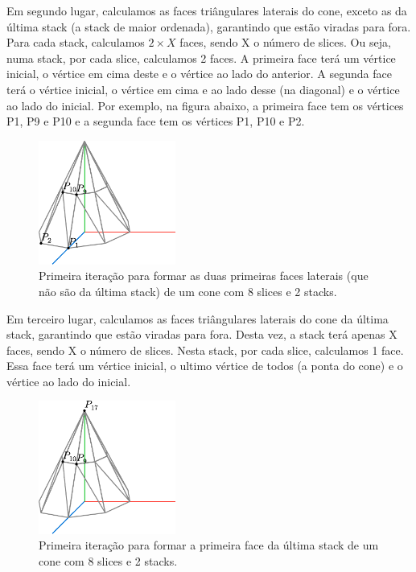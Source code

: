 \documentclass[12pt, a4paper]{article}
\begin{document}
Em segundo lugar, calculamos as faces triângulares laterais do cone, exceto as da última stack
(a stack de maior ordenada), garantindo que estão viradas para fora. Para cada stack, calculamos
$2 \times X$ faces, sendo X o número de slices. Ou seja, numa stack, por cada slice, calculamos
2 faces. A primeira face terá um vértice inicial, o vértice em cima deste e o vértice ao lado do
anterior. A segunda face terá o vértice inicial, o vértice em cima e ao lado desse (na diagonal) e o
vértice ao lado do inicial. Por exemplo, na figura abaixo, a primeira face tem os vértices P1,
P9 e P10 e a segunda face tem os vértices P1, P10 e P2.

\begin{figure}[H]
    \centering
    \includegraphics[width=0.4\textwidth]{res/figures/Cone4.pdf}
    \caption{
        Primeira iteração para formar as duas primeiras faces laterais (que
        não são da última stack) de um cone com 8 slices e 2 stacks.
    }
\end{figure}

Em terceiro lugar, calculamos as faces triângulares laterais do cone da última stack, garantindo
que estão viradas para fora. Desta vez, a stack terá apenas X faces, sendo X o número de slices.
Nesta stack, por cada slice, calculamos 1 face. Essa face terá um vértice inicial, o ultimo
vértice de todos (a ponta do cone) e o vértice ao lado do inicial.

\begin{figure}[H]
    \centering
    \includegraphics[width=0.4\textwidth]{res/figures/Cone5.pdf}
    \caption{
        Primeira iteração para formar a primeira face da última stack de um cone com 8 slices
        e 2 stacks.
    }
\end{figure}
\end{document}

